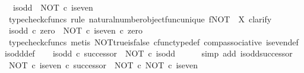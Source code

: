 \begin{isabellebody}
\ \ {\isachardoublequoteopen}is{\isacharunderscore}{\kern0pt}odd\ {\isacharequal}{\kern0pt}\ NOT\ {\isasymcirc}\isactrlsub c\ is{\isacharunderscore}{\kern0pt}even{\isachardoublequoteclose}\isanewline
%
\isadelimproof
%
\endisadelimproof
%
\isatagproof
{}\isamarkupfalse%
\ {\isacharparenleft}{\kern0pt}typecheck{\isacharunderscore}{\kern0pt}cfuncs{\isacharcomma}{\kern0pt}\ rule\ natural{\isacharunderscore}{\kern0pt}number{\isacharunderscore}{\kern0pt}object{\isacharunderscore}{\kern0pt}func{\isacharunderscore}{\kern0pt}unique{\isacharbrackleft}{\kern0pt}\ f{\isacharequal}{\kern0pt}{\isachardoublequoteopen}NOT{\isachardoublequoteclose}{\isacharcomma}{\kern0pt}\ \ X{\isacharequal}{\kern0pt}{\isachardoublequoteopen}{\isasymOmega}{\isachardoublequoteclose}{\isacharbrackright}{\kern0pt}{\isacharcomma}{\kern0pt}\ clarify{\isacharparenright}{\kern0pt}\isanewline
\ \ \isamarkupfalse%
\ {\isachardoublequoteopen}is{\isacharunderscore}{\kern0pt}odd\ {\isasymcirc}\isactrlsub c\ zero\ {\isacharequal}{\kern0pt}\ {\isacharparenleft}{\kern0pt}NOT\ {\isasymcirc}\isactrlsub c\ is{\isacharunderscore}{\kern0pt}even{\isacharparenright}{\kern0pt}\ {\isasymcirc}\isactrlsub c\ zero{\isachardoublequoteclose}\isanewline
\ \ \ \ \isamarkupfalse%
\ {\isacharparenleft}{\kern0pt}typecheck{\isacharunderscore}{\kern0pt}cfuncs{\isacharcomma}{\kern0pt}\ metis\ NOT{\isacharunderscore}{\kern0pt}true{\isacharunderscore}{\kern0pt}is{\isacharunderscore}{\kern0pt}false\ cfunc{\isacharunderscore}{\kern0pt}type{\isacharunderscore}{\kern0pt}def\ comp{\isacharunderscore}{\kern0pt}associative\ is{\isacharunderscore}{\kern0pt}even{\isacharunderscore}{\kern0pt}def{}\ is{\isacharunderscore}{\kern0pt}odd{\isacharunderscore}{\kern0pt}def{}{\isacharparenright}{\kern0pt}\isanewline
\isanewline
\ \ \isamarkupfalse%
\ {\isachardoublequoteopen}is{\isacharunderscore}{\kern0pt}odd\ {\isasymcirc}\isactrlsub c\ successor\ {\isacharequal}{\kern0pt}\ NOT\ {\isasymcirc}\isactrlsub c\ is{\isacharunderscore}{\kern0pt}odd{\isachardoublequoteclose}\isanewline
\ \ \ \ \isamarkupfalse%
\ {\isacharparenleft}{\kern0pt}simp\ add{\isacharcolon}{\kern0pt}\ is{\isacharunderscore}{\kern0pt}odd{\isacharunderscore}{\kern0pt}successor{\isacharparenright}{\kern0pt}\isanewline
\isanewline
\ \ \isamarkupfalse%
\ {\isachardoublequoteopen}{\isacharparenleft}{\kern0pt}NOT\ {\isasymcirc}\isactrlsub c\ is{\isacharunderscore}{\kern0pt}even{\isacharparenright}{\kern0pt}\ {\isasymcirc}\isactrlsub c\ successor\ {\isacharequal}{\kern0pt}\ NOT\ {\isasymcirc}\isactrlsub c\ NOT\ {\isasymcirc}\isactrlsub c\ is{\isacharunderscore}{\kern0pt}even{\isachardoublequoteclose}\isanewline

\end{isabellebody}

